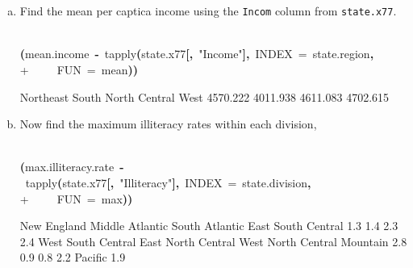 \documentclass{article}
\newcommand{\hlfunctioncall}[1]{\textcolor[rgb]{1,0,0}{#1}}%
\newcommand{\hlstring}[1]{\textcolor[rgb]{0.6,0.6,1}{#1}}%
\newcommand{\hlkeyword}[1]{\textcolor[rgb]{0,0,0}{\textbf{#1}}}%
\newcommand{\hlargument}[1]{\textcolor[rgb]{0.694117647058824,0.247058823529412,0.0196078431372549}{#1}}%
\newcommand{\hlassignement}[1]{\textcolor[rgb]{0.215686274509804,0.215686274509804,0.384313725490196}{\textbf{#1}}}%
\newcommand{\hlsymbol}[1]{\textcolor[rgb]{0,0,0}{#1}}%
\newcommand{\hlprompt}[1]{\textcolor[rgb]{0,0,0}{#1}}%
\newcommand{\hlstd}[1]{\textcolor[rgb]{0,0,0}{#1}}%
\newenvironment{Houtput}{\raggedright}{%
%
}
\begin{document}
    \section{}
    \begin{enumerate}[(a)]
        \item Find the mean per captica income using the \verb=Incom= column from \verb=state.x77=.
\begin{Houtput}
\hspace*{\fill}\\
\hlstd{}\ttfamily\noindent
\hlprompt{\usebox{\hlnormalsizeboxgreaterthan}{\ }}\hlkeyword{(}\hlsymbol{mean.income}{\ }\hlassignement{\usebox{\hlnormalsizeboxlessthan}-}{\ }\hlfunctioncall{tapply}\hlkeyword{(}\hlsymbol{state.x77}\hlkeyword{[}\hlkeyword{,}{\ }\hlstring{"Income"}\hlkeyword{]}\hlkeyword{,}{\ }\hlargument{INDEX}{\ }\hlargument{=}{\ }\hlsymbol{state.region}\hlkeyword{,}\hspace*{\fill}\\
\hlstd{}\hlprompt{+{\ }}{\ }{\ }{\ }{\ }\hlargument{FUN}{\ }\hlargument{=}{\ }\hlsymbol{mean}\hlkeyword{)}\hlkeyword{)}\mbox{}
\normalfont
\hspace*{\fill}\\
\hlstd{}\begin{Schunk}
\begin{Soutput}
    Northeast         South North Central          West 
     4570.222      4011.938      4611.083      4702.615 
\end{Soutput}

\end{Schunk}
\end{Houtput}
        \item Now find the maximum illiteracy rates within each division,
\begin{Houtput}
\hspace*{\fill}\\
\hlstd{}\ttfamily\noindent
\hlprompt{\usebox{\hlnormalsizeboxgreaterthan}{\ }}\hlkeyword{(}\hlsymbol{max.illiteracy.rate}{\ }\hlassignement{\usebox{\hlnormalsizeboxlessthan}-}{\ }\hlfunctioncall{tapply}\hlkeyword{(}\hlsymbol{state.x77}\hlkeyword{[}\hlkeyword{,}{\ }\hlstring{"Illiteracy"}\hlkeyword{]}\hlkeyword{,}{\ }\hlargument{INDEX}{\ }\hlargument{=}{\ }\hlsymbol{state.division}\hlkeyword{,}\hspace*{\fill}\\
\hlstd{}\hlprompt{+{\ }}{\ }{\ }{\ }{\ }\hlargument{FUN}{\ }\hlargument{=}{\ }\hlsymbol{max}\hlkeyword{)}\hlkeyword{)}\mbox{}
\normalfont
\hspace*{\fill}\\
\hlstd{}\begin{Schunk}
\begin{Soutput}
       New England    Middle Atlantic     South Atlantic East South Central 
               1.3                1.4                2.3                2.4 
West South Central East North Central West North Central           Mountain 
               2.8                0.9                0.8                2.2 
           Pacific 
               1.9 
\end{Soutput}


\end{Schunk}
\end{Houtput}
\end{enumerate}
\end{document}
